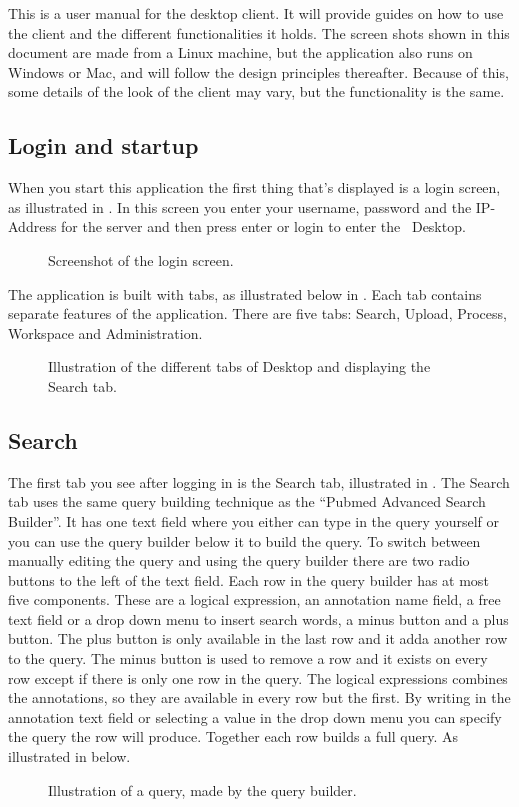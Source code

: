 This is a user manual for the desktop client. It will provide guides on how to 
use the client and the different functionalities it holds. The screen shots 
shown in this document are made from a Linux machine, but the application 
also runs on Windows or Mac, and will follow the design principles thereafter. 
Because of this, some details of the look of the client may vary, but the functionality is the same.

\subsection{Login and startup}
When you start this application the first thing that's displayed is a login screen, as illustrated in . In this screen you enter your username, password and the IP-Address for the server and then press enter or login to enter the \appName\ Desktop.

\begin{figure}[h!]
	\caption{Screenshot of the login screen.}
	\label{fig:des_login-pic}
\end{figure}
The application is built with tabs, as illustrated below in . Each tab contains separate features of the application. There are five tabs: Search, Upload, Process, Workspace and Administration.
\begin{figure}[htb]
	\caption{Illustration of the different tabs of \appName Desktop and displaying the Search tab.}
	\label{fig:des_tabs-view}
\end{figure}
\FloatBarrier

\subsection{Search}
The first tab you see after logging in is the Search tab, illustrated in . The Search tab uses the same query building technique as the “Pubmed Advanced Search Builder”\cite{des_3}. It has one text field where you either can type in the query yourself or you can use the query builder below it to build the query. To switch between manually editing the query and using the query builder there are two radio buttons to the left of the text field. Each row in the query builder has at most five components. These are a logical expression, an annotation name field, a free text field or a drop down menu to insert search words, a minus button and a plus button. The plus button is only available in the last row and it adda another row to the query. The minus button is used to remove a row and it exists on every row except if there is only one row in the query. The logical expressions combines the annotations, so they are available in every row but the first.
By writing in the annotation text field or selecting a value in the drop down menu you can specify the query the row will produce. Together each row builds a full query. As illustrated in  below.
\begin{figure}[htb]
	\caption{Illustration of a query, made by the query builder.}
	\label{fig:des_search-query}
\end{figure}
\FloatBarrier
